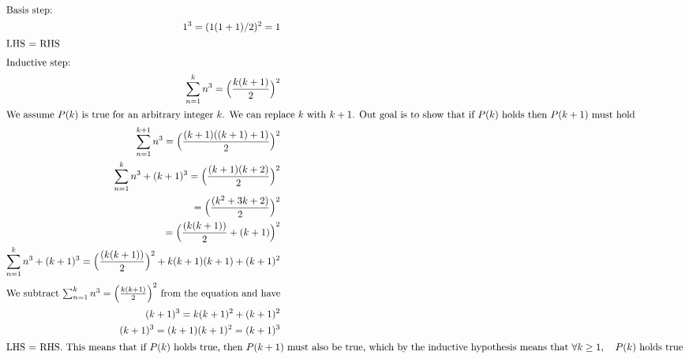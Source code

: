 \documentclass[12pt]{article}
\begin{document}
                    \begin{align}
                        \intertext{Basis step:}
                        1^3 = (1(1+1)/2)^2 = 1 \\
                        \intertext{LHS = RHS}
                        \intertext{Inductive step:}
                        \sum_{n=1}^k{n^3} = \Big(\frac{k(k+1)}{2}\Big)^2 \\ %
                        \intertext{We assume $P(k)$ is true for an arbitrary integer $k$. We can replace $k$ with $k+1$. Out goal is to show that if $P(k)$ holds then $P(k+1)$ must hold}
                        \sum_{n=1}^{k+1}{n^3} = \Big(\frac{(k+1)((k+1)+1)}{2}\Big)^2 \\
                        \sum_{n=1}^{k}{n^3} + (k+1)^3 = \Big(\frac{(k+1)(k+2)}{2}\Big)^2 \\
                        = \Big(\frac{(k^2+3k+2)}{2}\Big)^2 \\
                        = \Big(\frac{(k(k+1))}{2} + (k+1)\Big)^2 \\
                        \sum_{n=1}^{k}{n^3} + (k+1)^3 = \Big(\frac{(k(k+1))}{2}\Big)^2 + k(k+1)(k+1) + (k+1)^2 \\
                        \intertext{We subtract  $\sum_{n=1}^k{n^3} = \Big(\frac{k(k+1)}{2}\Big)^2$ from the equation and have}
                        (k+1)^3 = k(k+1)^2 + (k+1)^2 \\
                        (k+1)^3 = (k+1)(k+1)^2 = (k+1)^3 \\
                        \intertext{LHS = RHS. This means that if $P(k)$ holds true,
                        then $P(k+1)$ must also be true, which by the inductive
                        hypothesis means that $\forall k \geq 1, \quad P(k)$ holds true}
                    \end{align}
\end{document}
